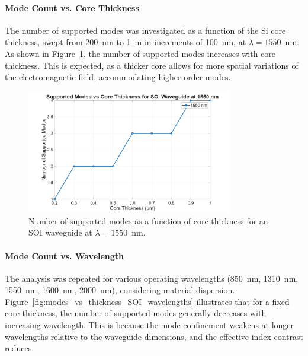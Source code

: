 \documentclass[10pt, a4paper]{article}
\begin{document}
\paragraph{Mode Count vs. Core Thickness}
The number of supported modes was investigated as a function of the Si core thickness, swept from 200~nm to 1~{\textmu}m in increments of 100~nm, at $\lambda = 1550$~nm. As shown in Figure~\ref{fig:modes_vs_thickness_SOI_1550nm}, the number of supported modes increases with core thickness. This is expected, as a thicker core allows for more spatial variations of the electromagnetic field, accommodating higher-order modes.

\begin{figure}[h!]
    \centering
    \includegraphics[width=0.8\textwidth]{task1/modes_vs_thickness_SOI_1550nm.png}
    \caption{Number of supported modes as a function of core thickness for an SOI waveguide at $\lambda = 1550$~nm.}
    \label{fig:modes_vs_thickness_SOI_1550nm}
\end{figure}

\paragraph{Mode Count vs. Wavelength}
The analysis was repeated for various operating wavelengths (850~nm, 1310~nm, 1550~nm, 1600~nm, 2000~nm), considering material dispersion. Figure~\ref{fig:modes_vs_thickness_SOI_wavelengths} illustrates that for a fixed core thickness, the number of supported modes generally decreases with increasing wavelength. This is because the mode confinement weakens at longer wavelengths relative to the waveguide dimensions, and the effective index contrast reduces.
\end{document}
